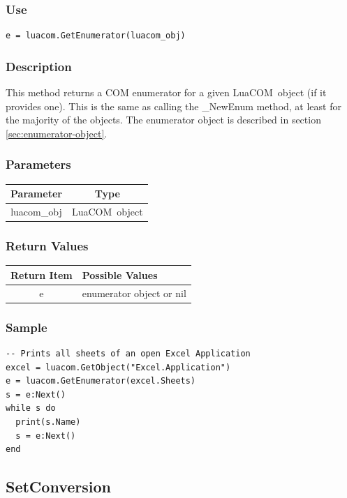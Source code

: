\documentclass[11pt,a4paper,english]{report}
\newcommand{\ttext}[1]{#1}
\newcommand{\ttext}[1]{{\raggedright #1 \\}}
\newcommand{\techname}[1]{\mbox{#1}}
\newcommand{\luacom}{\techname{LuaCOM}}
\begin{document}
\subsubsection*{Use}

\begin{verbatim}
e = luacom.GetEnumerator(luacom_obj)
\end{verbatim}

\subsubsection*{Description}
This method returns a COM enumerator for a given \luacom\ object (if
it provides one). This is the same as calling the \ttext{\_NewEnum}
method, at least for the majority of the objects. The enumerator
object is described in section \ref{sec:enumerator-object}.

\subsubsection*{Parameters}
\begin{tabular}{|c|c|}
\hline
\bf Parameter & \bf Type  \\ \hline \hline
luacom\_obj & \luacom\ object  \\ \hline
\end{tabular}

\subsubsection*{Return Values}

\begin{tabular}{|c|p{4cm}|}
\hline
\bf Return Item & \bf Possible Values \\ \hline \hline
e  & enumerator object or nil \\ \hline
\end{tabular}


\subsubsection*{Sample}

\begin{verbatim}
-- Prints all sheets of an open Excel Application
excel = luacom.GetObject("Excel.Application")
e = luacom.GetEnumerator(excel.Sheets)
s = e:Next()
while s do
  print(s.Name)
  s = e:Next()
end
\end{verbatim}

\subsection*{SetConversion}
\end{document}
